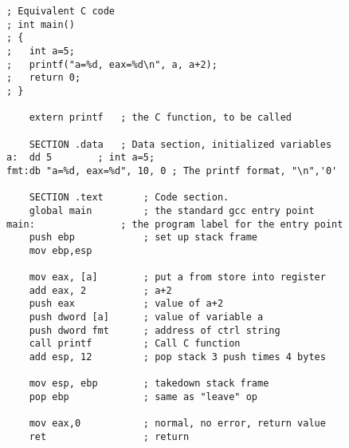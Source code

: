 \begin{lstlisting}[basicstyle=\ttfamily\small, frame=single] 
; Equivalent C code
; int main()
; {
;   int a=5;
;   printf("a=%d, eax=%d\n", a, a+2);
;   return 0;
; }

    extern printf	; the C function, to be called

    SECTION .data	; Data section, initialized variables
a:  dd 5		; int a=5;
fmt:db "a=%d, eax=%d", 10, 0 ; The printf format, "\n",'0'

    SECTION .text       ; Code section.
    global main         ; the standard gcc entry point
main:               ; the program label for the entry point
    push ebp            ; set up stack frame
    mov ebp,esp

    mov eax, [a]        ; put a from store into register
    add eax, 2          ; a+2
    push eax            ; value of a+2
    push dword [a]      ; value of variable a
    push dword fmt      ; address of ctrl string
    call printf         ; Call C function
    add esp, 12         ; pop stack 3 push times 4 bytes

    mov esp, ebp        ; takedown stack frame
    pop ebp             ; same as "leave" op

    mov	eax,0           ; normal, no error, return value
    ret	                ; return
\end{lstlisting}

